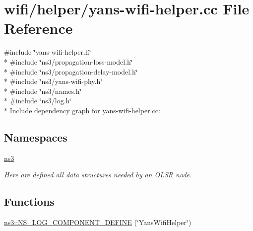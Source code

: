 \hypertarget{yans-wifi-helper_8cc}{}\section{wifi/helper/yans-\/wifi-\/helper.cc File Reference}
\label{yans-wifi-helper_8cc}
{\ttfamily \#include \char`\"{}yans-\/wifi-\/helper.\+h\char`\"{}}\\*
{\ttfamily \#include \char`\"{}ns3/propagation-\/loss-\/model.\+h\char`\"{}}\\*
{\ttfamily \#include \char`\"{}ns3/propagation-\/delay-\/model.\+h\char`\"{}}\\*
{\ttfamily \#include \char`\"{}ns3/yans-\/wifi-\/phy.\+h\char`\"{}}\\*
{\ttfamily \#include \char`\"{}ns3/names.\+h\char`\"{}}\\*
{\ttfamily \#include \char`\"{}ns3/log.\+h\char`\"{}}\\*
Include dependency graph for yans-\/wifi-\/helper.cc\+:
\subsection*{Namespaces}
\begin{DoxyCompactItemize}
\item 
 \hyperlink{namespacens3}{ns3}
\begin{DoxyCompactList}\small\item\em Here are defined all data structures needed by an O\+L\+SR node. \end{DoxyCompactList}\end{DoxyCompactItemize}
\subsection*{Functions}
\begin{DoxyCompactItemize}
\item 
\hyperlink{namespacens3_a9f0389e16b08f3791d80d08c4e433276}{ns3\+::\+N\+S\+\_\+\+L\+O\+G\+\_\+\+C\+O\+M\+P\+O\+N\+E\+N\+T\+\_\+\+D\+E\+F\+I\+NE} (\char`\"{}Yans\+Wifi\+Helper\char`\"{})
\end{DoxyCompactItemize}
